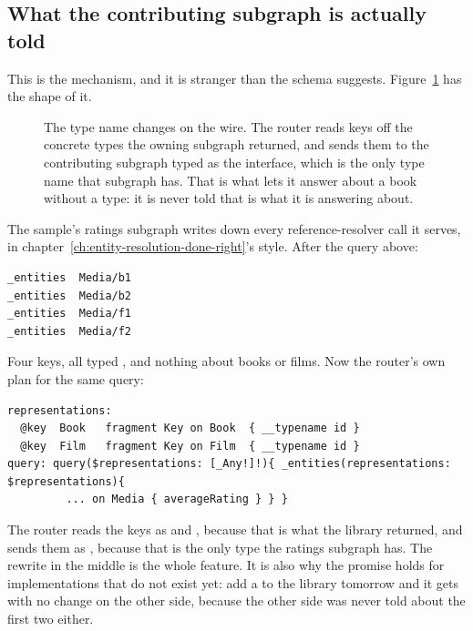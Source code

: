 \subsection*{What the contributing subgraph is actually told}

%
This is the mechanism, and it is stranger than the schema suggests.
Figure~\ref{fig:ch13-interface-object} has the shape of it.

\begin{figure}[htbp]
  \centering
  
  \caption{The type name changes on the wire. The router reads keys off the
  concrete types the owning subgraph returned, and sends them to the
  contributing subgraph typed as the interface, which is the only type name that
  subgraph has. That is what lets it answer about a book without a 
  type: it is never told that is what it is answering about.}
  \label{fig:ch13-interface-object}
\end{figure}

The sample's ratings subgraph writes down every reference-resolver call it
serves, in chapter~\ref{ch:entity-resolution-done-right}'s style. After the query
above:

\begin{verbatim}
_entities  Media/b1
_entities  Media/b2
_entities  Media/f1
_entities  Media/f2
\end{verbatim}

Four keys, all typed , and nothing about books or films. Now the
router's own plan for the same query:

\begin{verbatim}
representations:
  @key  Book   fragment Key on Book  { __typename id }
  @key  Film   fragment Key on Film  { __typename id }
query: query($representations: [_Any!]!){ _entities(representations: $representations){
         ... on Media { averageRating } } }
\end{verbatim}

The router reads the keys as  and , because that is what
the library returned, and sends them as , because that is the only
type the ratings subgraph has. The rewrite in the middle is the whole feature.
It is also why the promise holds for implementations that do not exist yet: add
a  to the library tomorrow and it gets  with no
change on the other side, because the other side was never told about the first
two either.

